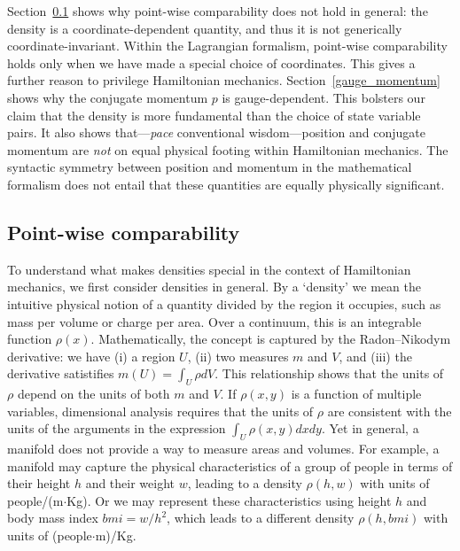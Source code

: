 \documentclass[12pt, english, twoside]{article} %
\begin{document}
Section~\ref{dependence} shows why point-wise comparability does not hold in general: the density is a coordinate-dependent quantity, and thus it is not generically coordinate-invariant. Within the Lagrangian formalism, point-wise comparability holds only when we have made a special choice of coordinates. This gives a further reason to privilege Hamiltonian mechanics. Section~\ref{gauge_momentum} shows why the conjugate momentum $p$ is gauge-dependent. This bolsters our claim that the density is more fundamental than the choice of state variable pairs. It also shows that---\textit{pace} conventional wisdom---position and conjugate momentum are \textit{not} on equal physical footing within Hamiltonian mechanics. The syntactic symmetry between position and momentum in the mathematical formalism does not entail that these quantities are equally physically significant. 


\subsection{Point-wise comparability}
\label{dependence}

To understand what makes densities special in the context of Hamiltonian mechanics, we first consider densities in general. By a `density' we mean the intuitive physical notion of a quantity divided by the region it occupies, such as mass per volume or charge per area. Over a continuum, this is an integrable function $\rho(x)$. Mathematically, the concept is captured by the Radon–Nikodym derivative: we have (i) a region $U$, (ii) two measures $m$ and $V$, and (iii) the derivative satistifies $m(U) = \int_U \rho dV$. This relationship shows that the units of $\rho$ depend on the units of both $m$ and $V$. If $\rho(x, y)$ is a function of multiple variables, dimensional analysis requires that the units of $\rho$ are consistent with the units of the arguments in the expression $\int_U \rho(x, y) dx dy$. Yet in general, a manifold does not provide a way to measure areas and volumes. For example, a manifold may capture the physical characteristics of a group of people in terms of their height $h$ and their weight $w$, leading to a density $\rho(h,w)$ with units of people/(m$\cdot$Kg). Or we may represent these characteristics using height $h$ and body mass index $bmi = w / h^2$, which leads to a different density $\rho(h,bmi)$ with units of (people$\cdot$m)/Kg.
\end{document}
